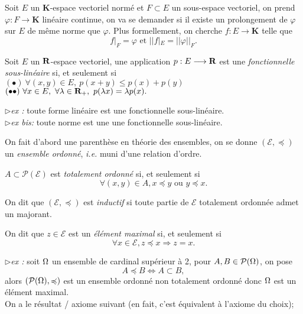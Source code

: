\documentclass[a4paper,11pt, twoside]{article}
\begin{document}
Soit $E$ un $\mathbf K$-espace vectoriel normé et $F\subset E$ un sous-espace vectoriel, on prend $\varphi:F\longrightarrow \mathbf K$ linéaire continue, on va se demander si il existe un prolongement de $\varphi$ sur $E$ de même norme que $\varphi$. Plus formellement, on cherche $f:E\longrightarrow \mathbf K$ telle que 
$$f\big|_F=\varphi\text{ et }||f|_E=||\varphi||_F.$$


\begin{Def}
  Soit $E$ un $\mathbf R$-espace vectoriel, une application $p:E\longrightarrow\mathbf R$ est une \emph{fonctionnelle sous-linéaire} si, et seulement si\\
  $(\bullet)\ \forall (x,y)\in E,\ p(x+y)\leqslant p(x)+p(y)$\\
  $(\bullet\bullet)\ \forall x\in E,\ \forall \lambda\in \mathbf R_+,\ p(\lambda x)=\lambda p(x).$
\end{Def}


$\triangleright$\emph{ex :} toute forme linéaire est une fonctionnelle sous-linéaire.\\

$\triangleright$\emph{ex bis:} toute norme est une une fonctionnelle sous-linéaire.\\[2em]



On fait d'abord une parenthèse en théorie des ensembles, on se donne $(\mathcal E,\preccurlyeq)$ un \emph{ensemble ordonné}, \emph{i.e.} muni d'une relation d'ordre.

$A\subset \mathcal P(\mathcal E)$ est \emph{totalement ordonné} si, et seulement si 
$$\forall (x,y)\in A, x\preccurlyeq y\text{ ou }y\preccurlyeq x.$$

On dit que $(\mathcal E,\preccurlyeq)$ est \emph{inductif} si toute partie de $\mathcal E$ totalement ordonnée admet un majorant.

On dit que $z\in \mathcal E$ est un \emph{élément maximal} si, et seulement si 
$$\forall x\in \mathcal E, z\preccurlyeq x\Rightarrow z=x.$$


$\triangleright$\emph{ex :} soit $\Omega$ un ensemble de cardinal supérieur à 2, pour $A,B\in\mathcal P(\Omega)$, on pose
$$A\preccurlyeq B\Leftrightarrow A\subset B,$$
alors $(\mathcal P(\Omega),\preccurlyeq)$ est un ensemble ordonné non totalement ordonné donc $\Omega$ est un élément maximal.\\[1em]

On a le résultat / axiome suivant (en fait, c'est équivalent à l'axiome du choix);
\end{document}
